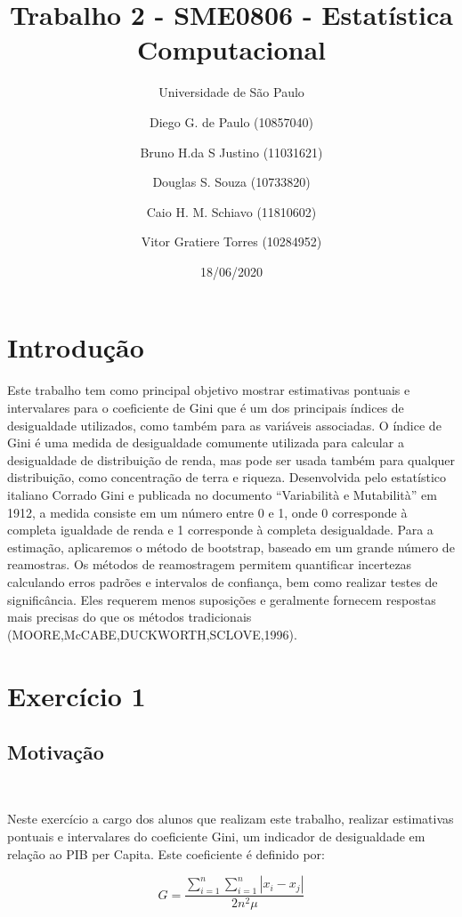 \documentclass[11pt,]{article}
\title{Trabalho 2 - SME0806 - Estatística Computacional}
\subtitle{Universidade de São Paulo}
\author{Diego G. de Paulo (10857040) \and Bruno H.da S Justino (11031621) \and Douglas S. Souza (10733820) \and Caio H. M. Schiavo (11810602) \and Vitor Gratiere Torres (10284952)}
\date{18/06/2020}
\begin{document}
\maketitle

\newpage
\tableofcontents
\newpage

\hypertarget{introduuxe7uxe3o}{%
\section{Introdução}\label{introduuxe7uxe3o}}

Este trabalho tem como principal objetivo mostrar estimativas pontuais e
intervalares para o coeficiente de Gini que é um dos principais índices
de desigualdade utilizados, como também para as variáveis associadas. O
índice de Gini é uma medida de desigualdade comumente utilizada para
calcular a desigualdade de distribuição de renda, mas pode ser usada
também para qualquer distribuição, como concentração de terra e riqueza.
Desenvolvida pelo estatístico italiano Corrado Gini e publicada no
documento ``Variabilità e Mutabilità'' em 1912, a medida consiste em um
número entre 0 e 1, onde 0 corresponde à completa igualdade de renda e 1
corresponde à completa desigualdade. Para a estimação, aplicaremos o
método de bootstrap, baseado em um grande número de reamostras. Os
métodos de reamostragem permitem quantificar incertezas calculando erros
padrões e intervalos de confiança, bem como realizar testes de
significância. Eles requerem menos suposições e geralmente fornecem
respostas mais precisas do que os métodos tradicionais
(MOORE,McCABE,DUCKWORTH,SCLOVE,1996).

\hypertarget{exercuxedcio-1}{%
\section{Exercício 1}\label{exercuxedcio-1}}

\hypertarget{motivauxe7uxe3o}{%
\subsection{Motivação}\label{motivauxe7uxe3o}}

~

Neste exercício a cargo dos alunos que realizam este trabalho, realizar
estimativas pontuais e intervalares do coeficiente Gini, um indicador de
desigualdade em relação ao PIB per Capita. Este coeficiente é definido
por:

\[G = \frac{\sum_{i=1}^n\sum_{i=1}^n |x_i-x_j|}{2n^2\mu}\]
\end{document}
